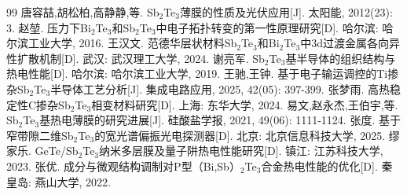 \documentclass[12pt,a4paper]{ctexart}
\begin{document}
\begin{thebibliography}{99}
 唐容喆,胡松柏,高静静,等. Sb$_2$Te$_3$薄膜的性质及光伏应用[J]. 太阳能, 2012(23): 3.
 赵堃. 压力下Bi$_2$Te$_3$和Sb$_2$Te$_3$中电子拓扑转变的第一性原理研究[D]. 哈尔滨: 哈尔滨工业大学, 2016.
 王汉文. 范德华层状材料Sb$_2$Te$_3$和Bi$_2$Te$_3$中3d过渡金属各向异性扩散机制[D]. 武汉: 武汉理工大学, 2024.
 谢亮军. Sb$_2$Te$_3$基半导体的组织结构与热电性能[D]. 哈尔滨: 哈尔滨工业大学, 2019.
 王驰,王钟. 基于电子输运调控的Ti掺杂Sb$_2$Te$_3$半导体工艺分析[J]. 集成电路应用, 2025, 42(05): 397-399.
 张梦雨. 高热稳定性C掺杂Sb$_2$Te$_3$相变材料研究[D]. 上海: 东华大学, 2024.
 易文,赵永杰,王伯宇,等. Sb$_2$Te$_3$基热电薄膜的研究进展[J]. 硅酸盐学报, 2021, 49(06): 1111-1124.
 张度. 基于窄带隙二维Sb$_2$Te$_3$的宽光谱偏振光电探测器[D]. 北京: 北京信息科技大学, 2025.
 缪家乐. GeTe/Sb$_2$Te$_3$纳米多层膜及量子阱热电性能研究[D]. 镇江: 江苏科技大学, 2023.
 张优. 成分与微观结构调制对P型（Bi,Sb）$_2$Te$_3$合金热电性能的优化[D]. 秦皇岛: 燕山大学, 2022.
\end{thebibliography}
\end{document}
